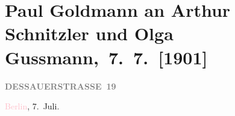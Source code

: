 

\renewcommand{\erwaehntePersonen}{Personen: Heinrich Kanner, Alfred Kerr, Olga Schnitzler, Isidor Singer, Elisabeth Steinrück}
\renewcommand{\erwaehnteInstitutionen}{Institutionen: Die Zeit, Die Zeit. Wiener Wochenschrift, Neue Freie Presse}
\renewcommand{\erwaehnteOrte}{Orte: Berlin, Dessauer Straße, Dresden, St. Anton am Arlberg, Urtijëi, Val Gardena, Wien, Wörthersee}
\renewcommand{\erwaehnteWerke}{Werke: Die Zeit, Die Zeit. Wiener Wochenschrift, Neue Freie Presse}
\section[ Paul Goldmann an Arthur Schnitzler und Olga Gussmann, 7. 7. {[}1901{]}]{Paul Goldmann an Arthur Schnitzler und Olga
               Gussmann, 7. 7. {[}1901{]}}
\nopagebreak{}
\rehead{ }\normalsize\beginnumbering{}
\toendnotes[C]{\smallbreak\pagebreak[2]}
\toendnotes[C]{\smallbreak}
\pstart
           \noindent{}\raggedleft{}{\pb}\textcolor{pink}{\textcolor{gray}{\textbf{DESSAUERSTRASSE 19}}}{}\ledrightnote{\textcolor{pink}{Dessauer Straße}}\pend
           
\pstart
           \textcolor{pink}{Berlin}{}\ledrightnote{\textcolor{pink}{Berlin}}, 7. Juli.\pend
           
